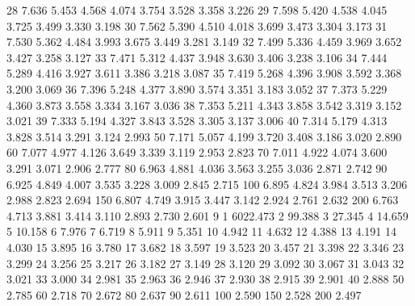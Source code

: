 \documentclass[onecolumn,12pt]{book}
\begin{document}
\begin{Schunk}
\begin{Soutput}
28     7.636    5.453    4.568    4.074    3.754    3.528    3.358    3.226
29     7.598    5.420    4.538    4.045    3.725    3.499    3.330    3.198
30     7.562    5.390    4.510    4.018    3.699    3.473    3.304    3.173
31     7.530    5.362    4.484    3.993    3.675    3.449    3.281    3.149
32     7.499    5.336    4.459    3.969    3.652    3.427    3.258    3.127
33     7.471    5.312    4.437    3.948    3.630    3.406    3.238    3.106
34     7.444    5.289    4.416    3.927    3.611    3.386    3.218    3.087
35     7.419    5.268    4.396    3.908    3.592    3.368    3.200    3.069
36     7.396    5.248    4.377    3.890    3.574    3.351    3.183    3.052
37     7.373    5.229    4.360    3.873    3.558    3.334    3.167    3.036
38     7.353    5.211    4.343    3.858    3.542    3.319    3.152    3.021
39     7.333    5.194    4.327    3.843    3.528    3.305    3.137    3.006
40     7.314    5.179    4.313    3.828    3.514    3.291    3.124    2.993
50     7.171    5.057    4.199    3.720    3.408    3.186    3.020    2.890
60     7.077    4.977    4.126    3.649    3.339    3.119    2.953    2.823
70     7.011    4.922    4.074    3.600    3.291    3.071    2.906    2.777
80     6.963    4.881    4.036    3.563    3.255    3.036    2.871    2.742
90     6.925    4.849    4.007    3.535    3.228    3.009    2.845    2.715
100    6.895    4.824    3.984    3.513    3.206    2.988    2.823    2.694
150    6.807    4.749    3.915    3.447    3.142    2.924    2.761    2.632
200    6.763    4.713    3.881    3.414    3.110    2.893    2.730    2.601
           9
1   6022.473
2     99.388
3     27.345
4     14.659
5     10.158
6      7.976
7      6.719
8      5.911
9      5.351
10     4.942
11     4.632
12     4.388
13     4.191
14     4.030
15     3.895
16     3.780
17     3.682
18     3.597
19     3.523
20     3.457
21     3.398
22     3.346
23     3.299
24     3.256
25     3.217
26     3.182
27     3.149
28     3.120
29     3.092
30     3.067
31     3.043
32     3.021
33     3.000
34     2.981
35     2.963
36     2.946
37     2.930
38     2.915
39     2.901
40     2.888
50     2.785
60     2.718
70     2.672
80     2.637
90     2.611
100    2.590
150    2.528
200    2.497
\end{Soutput}
\end{Schunk}
\vfill
\eject


\end{document}
